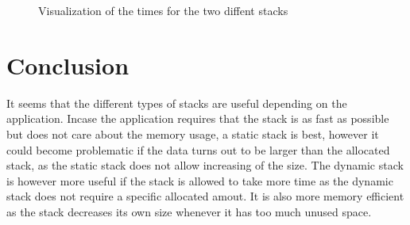 \documentclass[a4paper,11pt]{article}
\begin{document}
\begin{figure}[h]
\centering    

\scalebox{0.5}{}
\caption{Visualization of the times for the two diffent stacks}   
\label{tab:figure1} 

\end{figure}


\section*{Conclusion}
It seems that the different types of stacks are useful depending on the application. Incase the 
application requires that the stack is as fast as possible but does not care about the memory usage,
a static stack is best, however it could become problematic if the data turns out to be larger than the allocated stack, 
as the static stack does not allow increasing of the size. The dynamic stack is however more useful if the stack is allowed 
to take more time as the dynamic stack does not require a specific allocated amout. It is also more memory efficient as the stack 
decreases its own size whenever it has too much unused space.
\end{document}
